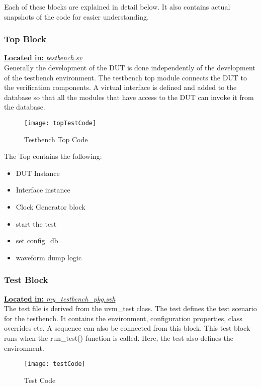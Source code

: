 \documentclass[a4paper,11pt]{article}
\begin{document}
Each of these blocks are explained in detail below. It also contains actual snapshots of the code for easier understanding.

\FloatBarrier
\subsubsection{Top Block}
\underline{\textbf{Located in:} \textit{testbench.sv}}\\

Generally the development of the DUT is done independently of the development of the testbench environment. The testbench top module connects the DUT to the verification components. A virtual interface is defined and added to the database so that all the modules that have access to the DUT can invoke it from the database.

\begin{figure}[ht]
\centering
\texttt{[image: topTestCode]}
\caption{Testbench Top Code}
\end{figure}

The Top contains the following:

\begin{itemize}[noitemsep]
\item DUT Instance
\item Interface instance
\item Clock Generator block
\item start the test
\item set config\_db
\item waveform dump logic
\end{itemize}
 

\subsubsection{Test Block}
\underline{\textbf{Located in:} \textit{my\_testbench\_pkg.svh}}\\

The test file is derived from the uvm\_test class. The test defines the test scenario for the testbench. It contains the environment, configuration properties, class overrides etc. A sequence can also be connected from this block. This test block runs when the run\_test() function is called. Here, the test also defines the environment.
\begin{figure}[ht]
\centering
\texttt{[image: testCode]}
\caption{Test Code}
\end{figure}
\end{document}
